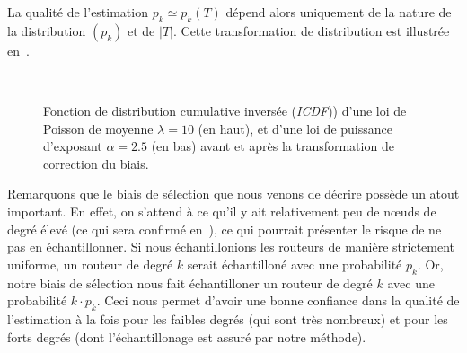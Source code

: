 La qualité de l'estimation $ p_k \simeq p_k(T) $ dépend alors uniquement de la
nature de la distribution $(p_k)$ et de $|T|$. Cette transformation de
distribution est illustrée en~.

\begin{figure}[!ht]\centering
{}
\\
\caption[Transformation de correction du biais]{Fonction de
distribution cumulative inversée ({\em ICDF})) d'une loi de Poisson
de moyenne $\lambda=10$ (en haut), et d'une loi de puissance d'exposant $\alpha
= 2.5$  (en bas) avant et après la transformation de correction du biais.}
\label{fig:udpping-bias}
\end{figure}

Remarquons que le biais de sélection que nous venons de décrire possède un atout
important. En effet, on s'attend à ce qu'il y ait relativement peu de n\oe{}uds
de degré élevé (ce qui sera confirmé en~), ce qui
pourrait présenter le risque de ne pas en échantillonner. Si nous
échantillonions les routeurs de manière strictement uniforme, un routeur de
degré $k$ serait échantilloné avec une probabilité $p_k$. Or, notre biais de
sélection nous fait échantilloner un routeur de degré $k$ avec une probabilité
$k \cdot p_k$. Ceci nous permet d'avoir une bonne confiance dans la qualité de
l'estimation à la fois pour les faibles degrés (qui sont très nombreux) et pour
les forts degrés (dont l'échantillonage est assuré par notre méthode).

